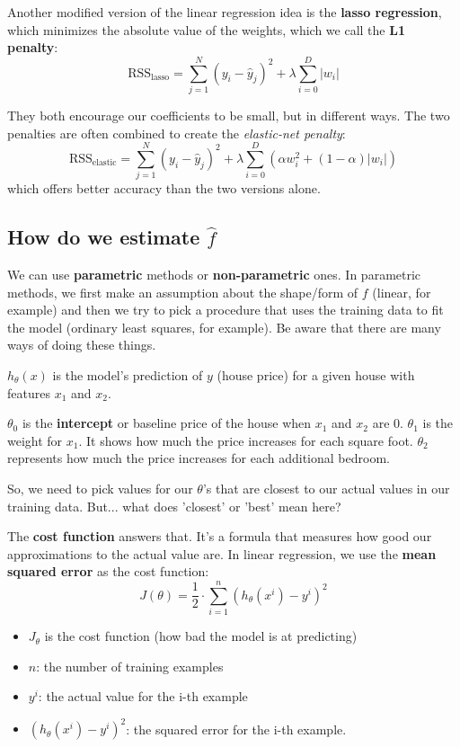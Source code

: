 \documentclass{book}
\begin{document}
Another modified version of the linear regression idea is the \textbf{lasso regression}, which minimizes the absolute value of the weights, which we call the \textbf{L1 penalty}:
\[
\text{RSS}_{\text{lasso}} = \sum_{j=1}^N (y_i - \hat{y}_j)^2 + \lambda \sum_{i=0}^D |w_i|
\]

They both encourage our coefficients to be small, but in different ways. The two penalties are often combined to create the \textit{elastic-net penalty}:
\[
\text{RSS}_{\text{elastic}} = \sum_{j=1}^N (y_i - \hat{y}_j)^2 + \lambda \sum_{i=0}^D (\alpha w_i^2 + (1 - \alpha) |w_i|)
\]
which offers better accuracy than the two versions alone.

\subsection{How do we estimate $\hat{f}$}
We can use \textbf{parametric} methods or \textbf{non-parametric} ones. In parametric methods, we first make an assumption about the shape/form of $f$ (linear, for example) and then we try to pick a procedure that uses the training data to fit the model (ordinary least squares, for example). Be aware that there are many ways of doing these things.

$h_{\theta}(x)$ is the model's prediction of $y$ (house price) for a given house with features $x_1$ and $x_2$.

$\theta_0$ is the \textbf{intercept} or baseline price of the house when $x_1$ and $x_2$ are 0. $\theta_1$ is the weight for $x_1$. It shows how much the price increases for each square foot. $\theta_2$ represents how much the price increases for each additional bedroom.

So, we need to pick values for our $\theta$'s that are closest to our actual values in our training data. But... what does 'closest' or 'best' mean here?

The \textbf{cost function} answers that. It's a formula that measures how good our approximations to the actual value are. In linear regression, we use the \textbf{mean squared error} as the cost function:
\[
J(\theta) = \frac{1}{2} \cdot \sum_{i=1}^{n} (h_{\theta}(x^i) - y^i)^2
\]
\begin{itemize}
    \item $J_{\theta}$ is the cost function (how bad the model is at predicting)
    \item $n$: the number of training examples
    \item $y^i$: the actual value for the i-th example
    \item $(h_{\theta}(x^i) - y^i)^2$: the squared error for the i-th example.
\end{itemize}
\end{document}
